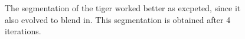 \documentclass[11pt,a4paper]{article}
\begin{document}
\begin{figure}
\centering
{}
\quad
{}

\caption{The segmentation of the tiger worked better as excpeted, since it also evolved to blend in. This segmentation is obtained after 4 iterations.}%

\end{figure}
\end{document}
